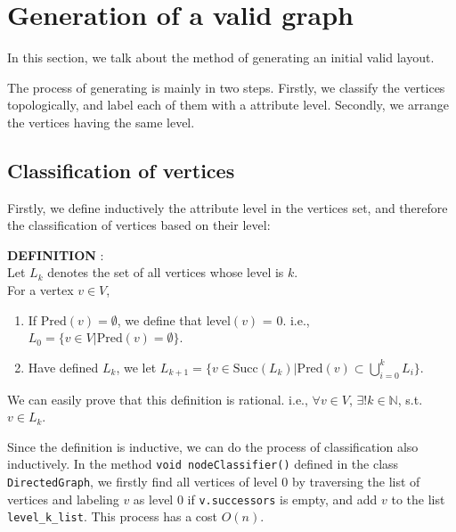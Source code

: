 \section{Generation of a valid graph}
\label{chapter2}
\textit{}

In this section, we talk about the method of generating an initial valid layout. 

The process of generating is mainly in two steps. 
Firstly, we classify the vertices topologically, and label each of them with a attribute level. 
Secondly, we arrange the vertices having the same level.

\subsection{Classification of vertices}
Firstly, we define inductively the attribute level in the vertices set, and therefore the classification of vertices based on their level:

\noindent\textbf{DEFINITION} : \\
Let $L_k$ denotes the set of all vertices whose level is $k$.\\
For a vertex $v\in V$,
\begin{enumerate}
    \item If $\text{Pred}(v) = \emptyset$, we define that level$(v)$ = 0. i.e., $L_0 = \{v\in V | \text{Pred}(v) = \emptyset \}$.
    \item Have defined $L_k$, we let $L_{k+1} = \{v \in \text{Succ}(L_k) | \text{Pred}(v) \subset \bigcup_{i=0}^{k}L_i\}$.
\end{enumerate}

We can easily prove that this definition is rational. i.e., $\forall v \in V$, $\exists! k \in \mathbb{N}$, s.t. $v \in L_k$.

Since the definition is inductive, we can do the process of classification also inductively. 
In the method \lstinline{void nodeClassifier()} defined in the class \lstinline{DirectedGraph}, we firstly find all vertices of level $0$ by traversing the list of vertices and labeling $v$ as level $0$ if \lstinline{v.successors} is empty, and add $v$ to the list \lstinline{level_k_list}. This process has a cost $O(n)$. 


